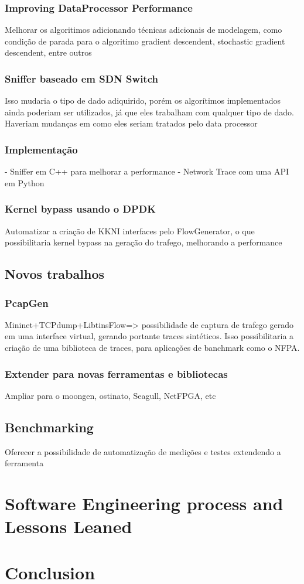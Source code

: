 \subsubsection{Improving DataProcessor Performance}

Melhorar os algoritimos adicionando técnicas adicionais de modelagem, como condição de parada para o algoritimo gradient descendent, stochastic gradient descendent, entre outros


\subsubsection{Sniffer baseado em SDN Switch}
Isso mudaria o tipo de dado adiquirido, porém os algorítimos implementados ainda poderiam ser utilizados, já que eles trabalham com qualquer tipo de dado. Haveriam mudanças em como eles seriam tratados pelo data processor


\subsubsection{Implementação}

- Sniffer em C++ para melhorar a performance
- Network Trace com uma API em Python


\subsubsection{Kernel bypass usando o DPDK}

Automatizar a criação de KKNI interfaces pelo FlowGenerator, o que possibilitaria kernel bypass na geração do trafego, melhorando a performance

\subsection{Novos trabalhos}

\subsubsection{PcapGen}

Mininet+TCPdump+LibtinsFlow=> possibilidade de captura de trafego gerado em uma interface virtual, gerando portante traces sintéticos.
Isso possibilitaria a criação de uma biblioteca de traces, para aplicações de banchmark como o NFPA.

\subsubsection{Extender para novas ferramentas e bibliotecas}

Ampliar para o moongen, ostinato, Seagull, NetFPGA, etc

\subsection{Benchmarking}

Oferecer a possibilidade de automatização de medições e testes extendendo a ferramenta

\section{Software Engineering process and Lessons Leaned}

\section{Conclusion}



